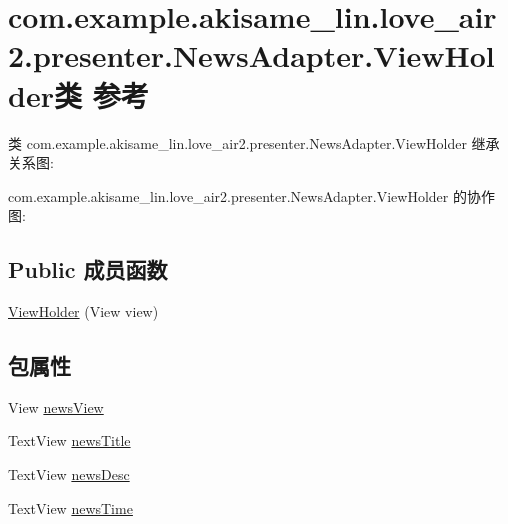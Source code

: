 \hypertarget{classcom_1_1example_1_1akisame__lin_1_1love__air2_1_1presenter_1_1_news_adapter_1_1_view_holder}{}\section{com.\+example.\+akisame\+\_\+lin.\+love\+\_\+air2.\+presenter.\+News\+Adapter.\+View\+Holder类 参考}
\label{classcom_1_1example_1_1akisame__lin_1_1love__air2_1_1presenter_1_1_news_adapter_1_1_view_holder}


类 com.\+example.\+akisame\+\_\+lin.\+love\+\_\+air2.\+presenter.\+News\+Adapter.\+View\+Holder 继承关系图\+:


com.\+example.\+akisame\+\_\+lin.\+love\+\_\+air2.\+presenter.\+News\+Adapter.\+View\+Holder 的协作图\+:
\subsection*{Public 成员函数}
\begin{DoxyCompactItemize}
\item 
\mbox{\hyperlink{classcom_1_1example_1_1akisame__lin_1_1love__air2_1_1presenter_1_1_news_adapter_1_1_view_holder_a2a0d82785f8a5223b15395be4fa40652}{View\+Holder}} (View view)
\end{DoxyCompactItemize}
\subsection*{包属性}
\begin{DoxyCompactItemize}
\item 
View \mbox{\hyperlink{classcom_1_1example_1_1akisame__lin_1_1love__air2_1_1presenter_1_1_news_adapter_1_1_view_holder_aa50e33eb953a01100092757502ca85e8}{news\+View}}
\item 
Text\+View \mbox{\hyperlink{classcom_1_1example_1_1akisame__lin_1_1love__air2_1_1presenter_1_1_news_adapter_1_1_view_holder_aa59507f48329e3b2a70ec9b32103e4e3}{news\+Title}}
\item 
Text\+View \mbox{\hyperlink{classcom_1_1example_1_1akisame__lin_1_1love__air2_1_1presenter_1_1_news_adapter_1_1_view_holder_ac7a293c2a055111752050499bca65f60}{news\+Desc}}
\item 
Text\+View \mbox{\hyperlink{classcom_1_1example_1_1akisame__lin_1_1love__air2_1_1presenter_1_1_news_adapter_1_1_view_holder_a9f3b4d412844ab1072e29b4cbe4c64cb}{news\+Time}}
\end{DoxyCompactItemize}


